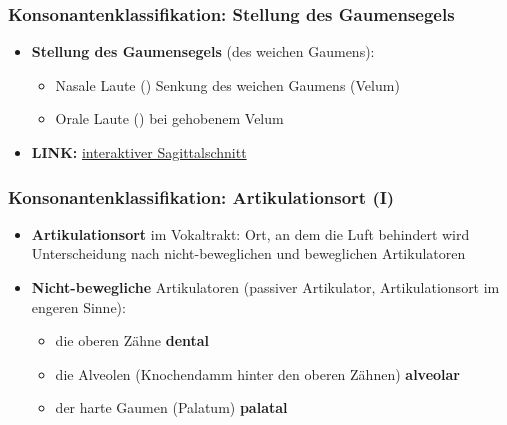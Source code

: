 \begin{frame}
\frametitle{Konsonantenklassifikation: Stellung des Gaumensegels}

	\begin{itemize}
		\item \textbf{Stellung des Gaumensegels} (des weichen Gaumens):
		
		\begin{itemize}
			
			\item Nasale Laute (\zB \textipa{ [ m, n ]}) \ras Senkung des weichen Gaumens (Velum)
			
			\item Orale Laute (\zB \textipa{ [ f, a ]}) \ras bei gehobenem Velum
		\end{itemize}
		
		
		\item[] \textbf{LINK:} \href{http://smu-facweb.smu.ca/~s0949176/sammy/}{interaktiver Sagittalschnitt}
	\end{itemize}
	
\end{frame}


\begin{frame}
\frametitle{Konsonantenklassifikation: Artikulationsort (I)}

	\begin{itemize}
	\item \textbf{Artikulationsort} im Vokaltrakt: Ort, an dem die Luft behindert wird
          Unterscheidung nach nicht-beweglichen und beweglichen Artikulatoren

\medskip
		
		\item \textbf{Nicht-bewegliche} Artikulatoren (passiver Artikulator, Artikulationsort im engeren Sinne):
			
		\begin{itemize}
			\item die oberen Zähne \ras \textbf{dental}
			
			\item die Alveolen (Knochendamm hinter den oberen Zähnen) \ras \textbf{alveolar}
			
			\item der harte Gaumen (Palatum) \ras \textbf{palatal}
		\end{itemize}
		
	\end{itemize}
	
\end{frame}


